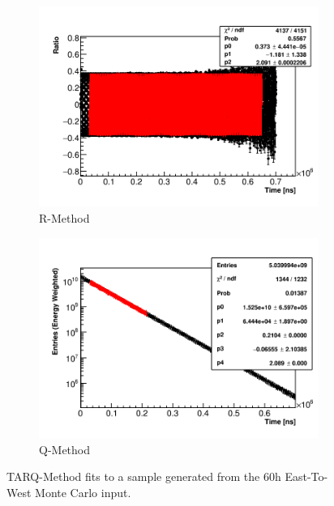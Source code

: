 \begin{figure}[]
    \begin{subfigure}[t]{0.45\textwidth}
        \centering
        \includegraphics[width=\textwidth]{Example_RMethod_Fit}
        \caption{R-Method}
    \end{subfigure}
    \hspace{1mm}
    \begin{subfigure}[t]{0.45\textwidth}
        \centering
        \includegraphics[width=\textwidth]{Example_QMethod_Fit}
        \caption{Q-Method}
    \end{subfigure}
\caption[]{TARQ-Method fits to a sample generated from the 60h East-To-West Monte Carlo input.}
\label{fig:sampleFits}
\end{figure}


